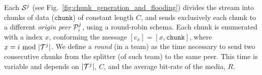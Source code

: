 \begin{figure*}
  \caption{Chunk generation and
    flooding.\label{fig:chunk_generation_and_flooding}}
\end{figure*}
Each ${\cal S}^j$ (see Fig.~\ref{fig:chunk_generation_and_flooding})
divides the stream into chunks of data ($\mathtt{chunk}$) of constant
length $C$, and sends exclusively each chunk to a different
\emph{origin peer} ${\cal P}^j_i$, using a round-robin schema. Each
chunk is enumerated with a index $x$, conforming the message
$[c_x]=[x,\mathtt{chunk}]$, where $x=i~\mathrm{mod}~|{\cal T}^j|$. We
define a \emph{round} (in a team) as the time necessary to send two
consecutive chunks from the splitter (of such team) to the same
peer. This time is variable and depends on $|{\cal T}^j|$, $C$, and
the average bit-rate of the media, $R$.

\begin{comment}
The round-time is defined by:
\begin{equation}
  \cal{r} = \cal{c}N.
  \label{eq:round_time}
\end{equation}
For example, if we use only one team of $N=256$ peers, a chunk size
$C=1024$~bytes, and a video of $1$~Mb/s, the round time is
\begin{displaymath}
  \cal{r} = \frac{1024\frac{\text{bytes}}{\text{chunk}}\times
    8\frac{\text{bits}}{\text{byte}}}{10^6\frac{\text{bits}}{\text{second}}}\times
  256 \approx 2.1~\text{seconds}.
\end{displaymath}
\end{comment}
